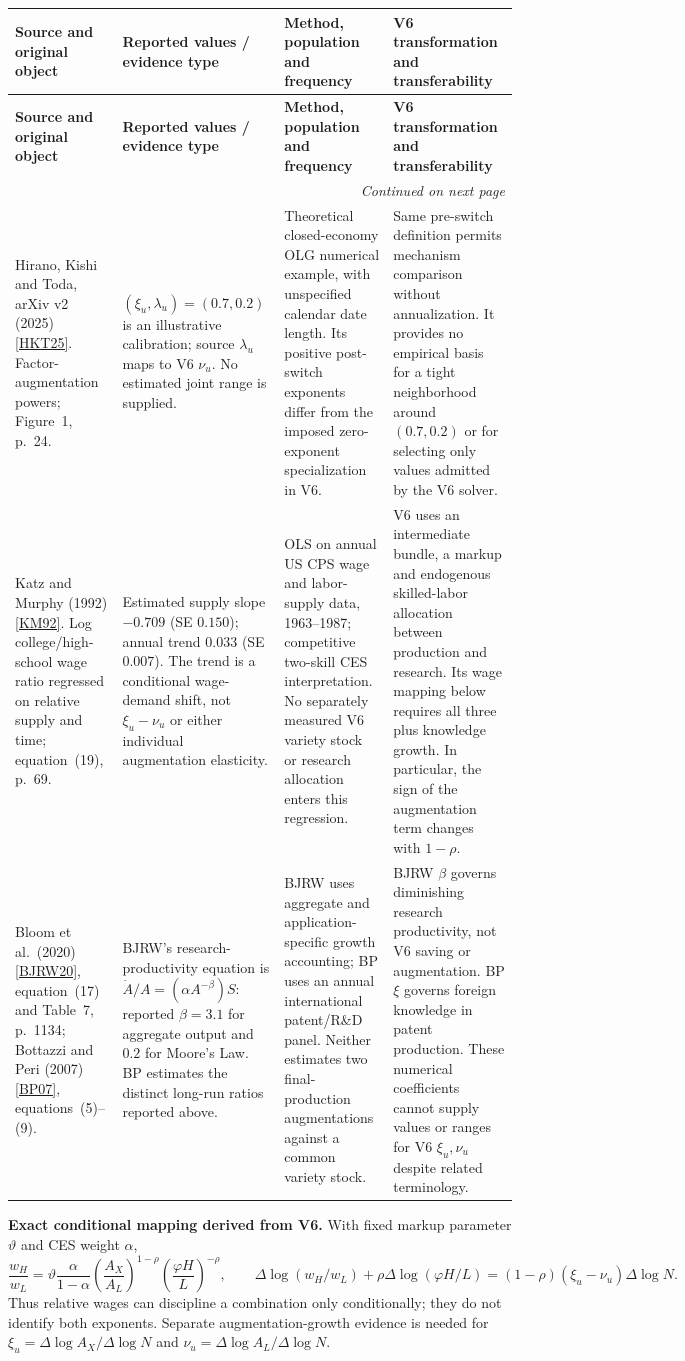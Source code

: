 \documentclass[10pt,a4paper,landscape]{article}
\makeatletter
\newcommand{\src}[1]{\hyperlink{ref:#1}{\textsf{[#1]}}}
\newenvironment{evidence}{%
\fontsize{9.4}{10.9}\selectfont\setlength{\parskip}{2pt}
\begin{longtable}{@{}P{\dimexpr .22\textwidth-7.5pt\relax}P{\dimexpr .24\textwidth-7.5pt\relax}P{\dimexpr .25\textwidth-7.5pt\relax}P{\dimexpr .29\textwidth-7.5pt\relax}@{}}
\toprule\rowcolor{tablehead}\textbf{Source and original object} & \textbf{Reported values / evidence type} & \textbf{Method, population and frequency} & \textbf{V6 transformation and transferability}\\\midrule
\endfirsthead
\toprule\rowcolor{tablehead}\textbf{Source and original object} & \textbf{Reported values / evidence type} & \textbf{Method, population and frequency} & \textbf{V6 transformation and transferability}\\\midrule
\endhead
\midrule\multicolumn{4}{r}{\footnotesize\itshape Continued on next page}\\\endfoot
\bottomrule\endlastfoot
}{\end{longtable}}
\makeatother
\begin{document}
\begin{evidence}
Hirano, Kishi and Toda, arXiv v2 (2025) \src{HKT25}.
Factor-augmentation powers; Figure~1, p.~24.
&
$(\xi_u,\lambda_u)=(0.7,0.2)$ is an illustrative calibration;
source $\lambda_u$ maps to V6 $\nu_u$. No estimated joint range is supplied.
&
Theoretical closed-economy OLG numerical example, with unspecified calendar
date length. Its positive post-switch exponents differ from the imposed
zero-exponent specialization in V6.
&
Same pre-switch definition permits mechanism comparison without
annualization. It provides no empirical basis for a tight neighborhood
around $(0.7,0.2)$ or for selecting only values admitted by the V6 solver.
\\[5pt]
Katz and Murphy (1992) \src{KM92}.
Log college/high-school wage ratio regressed on relative supply and time;
equation~(19), p.~69.
&
Estimated supply slope $-0.709$ (SE $0.150$); annual trend $0.033$
(SE $0.007$). The trend is a conditional wage-demand shift, not
$\xi_u-\nu_u$ or either individual augmentation elasticity.
&
OLS on annual US CPS wage and labor-supply data, 1963--1987;
competitive two-skill CES interpretation. No separately measured
V6 variety stock or research allocation enters this regression.
&
V6 uses an intermediate bundle, a markup and endogenous skilled-labor
allocation between production and research. Its wage mapping below
requires all three plus knowledge growth. In particular, the sign of
the augmentation term changes with $1-\rho$.
\\[5pt]
Bloom et al.\ (2020) \src{BJRW20}, equation~(17) and Table~7, p.~1134;
Bottazzi and Peri (2007) \src{BP07}, equations~(5)--(9).
&
BJRW's research-productivity equation is
$\dot A/A=(\alpha A^{-\beta})S$:
reported $\beta=3.1$ for aggregate output and $0.2$ for Moore's Law.
BP estimates the distinct long-run ratios reported above.
&
BJRW uses aggregate and application-specific growth accounting;
BP uses an annual international patent/R\&D panel. Neither estimates
two final-production augmentations against a common variety stock.
&
BJRW $\beta$ governs diminishing research productivity, not V6 saving
or augmentation. BP $\xi$ governs foreign knowledge in patent production.
These numerical coefficients cannot supply values or ranges for
V6 $\xi_u,\nu_u$ despite related terminology.
\\[5pt]
\end{evidence}

\noindent\textbf{Exact conditional mapping derived from V6.}
With fixed markup parameter $\vartheta$ and CES weight $\alpha$,
\[
 \frac{w_H}{w_L}=\vartheta\frac{\alpha}{1-\alpha}
 \left(\frac{A_X}{A_L}\right)^{1-\rho}
 \left(\frac{\varphi H}{L}\right)^{-\rho},\qquad
 \Delta\log(w_H/w_L)+\rho\Delta\log(\varphi H/L)
 =(1-\rho)(\xi_u-\nu_u)\Delta\log N.
\]
Thus relative wages can discipline a combination only conditionally;
they do not identify both exponents. Separate augmentation-growth evidence
is needed for $\xi_u=\Delta\log A_X/\Delta\log N$ and
$\nu_u=\Delta\log A_L/\Delta\log N$.
\end{document}
